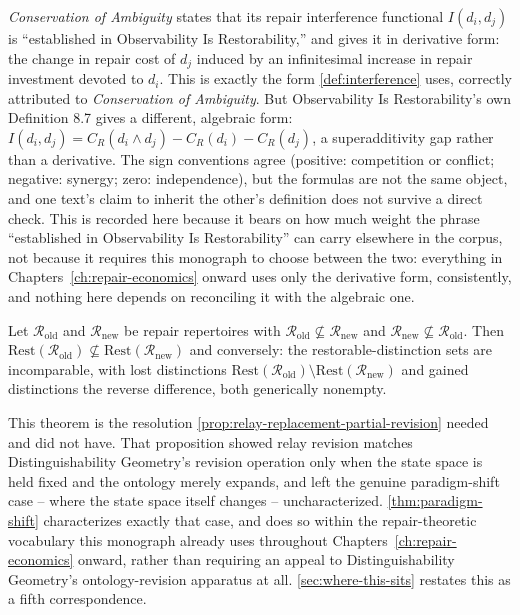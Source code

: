 \begin{remark}
\label{rem:interference-inconsistency}
\emph{Conservation of Ambiguity} states that its repair interference
functional $I(d_i,d_j)$ is ``established in Observability Is
Restorability,'' and gives it in derivative form: the change in repair
cost of $d_j$ induced by an infinitesimal increase in repair investment
devoted to $d_i$. This is exactly the form \cref{def:interference} uses,
correctly attributed to \emph{Conservation of Ambiguity}. But Observability
Is Restorability's own Definition 8.7 gives a different, algebraic form:
$I(d_i,d_j) = C_R(d_i \wedge d_j) - C_R(d_i) - C_R(d_j)$, a superadditivity
gap rather than a derivative. The sign conventions agree (positive:
competition or conflict; negative: synergy; zero: independence), but the
formulas are not the same object, and one text's claim to inherit the
other's definition does not survive a direct check. This is recorded here
because it bears on how much weight the phrase ``established in
Observability Is Restorability'' can carry elsewhere in the corpus, not
because it requires this monograph to choose between the two: everything
in Chapters~\ref{ch:repair-economics} onward uses only the derivative
form, consistently, and nothing here depends on reconciling it with the
algebraic one.
\end{remark}

\begin{theorem}
\label{thm:paradigm-shift}
Let $\mathcal{R}_{\mathrm{old}}$ and $\mathcal{R}_{\mathrm{new}}$ be repair
repertoires with $\mathcal{R}_{\mathrm{old}} \not\subseteq
\mathcal{R}_{\mathrm{new}}$ and $\mathcal{R}_{\mathrm{new}} \not\subseteq
\mathcal{R}_{\mathrm{old}}$. Then $\mathrm{Rest}(\mathcal{R}_{\mathrm{old}})
\not\subseteq \mathrm{Rest}(\mathcal{R}_{\mathrm{new}})$ and conversely: the
restorable-distinction sets are incomparable, with lost distinctions
$\mathrm{Rest}(\mathcal{R}_{\mathrm{old}}) \setminus
\mathrm{Rest}(\mathcal{R}_{\mathrm{new}})$ and gained distinctions the
reverse difference, both generically nonempty.
\end{theorem}

This theorem is the resolution \cref{prop:relay-replacement-partial-revision}
needed and did not have. That proposition showed relay revision matches
Distinguishability Geometry's revision operation only when the state space
is held fixed and the ontology merely expands, and left the genuine
paradigm-shift case -- where the state space itself changes --
uncharacterized. \cref{thm:paradigm-shift} characterizes exactly that case,
and does so within the repair-theoretic vocabulary this monograph already
uses throughout Chapters~\ref{ch:repair-economics} onward, rather than
requiring an appeal to Distinguishability Geometry's ontology-revision
apparatus at all. \cref{sec:where-this-sits} restates this as a fifth
correspondence.

